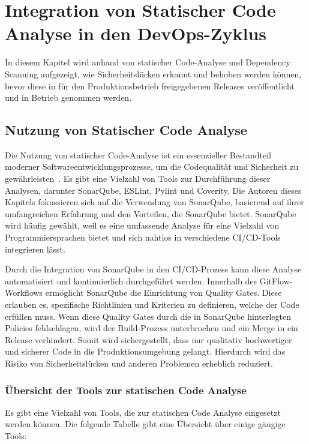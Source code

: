 \section{Integration von Statischer Code Analyse in den DevOps-Zyklus}
In diesem Kapitel wird anhand von statischer Code-Analyse und Dependency Scanning aufgezeigt, wie Sicherheitslücken erkannt und behoben werden können, bevor diese in für den Produktionsbetrieb freigegebenen Releases veröffentlicht und in Betrieb genommen werden.

\subsection{Nutzung von Statischer Code Analyse}
Die Nutzung von statischer Code-Analyse ist ein essenzieller Bestandteil moderner Softwareentwicklungsprozesse, um die Codequalität und Sicherheit zu gewährleisten~\cite{Bardas2010}. Es gibt eine Vielzahl von Tools zur Durchführung dieser Analysen, darunter SonarQube, ESLint, Pylint und Coverity. Die Autoren dieses Kapitels fokussieren sich auf die Verwendung von SonarQube, basierend auf ihrer umfangreichen Erfahrung und den Vorteilen, die SonarQube bietet. SonarQube wird häufig gewählt, weil es eine umfassende Analyse für eine Vielzahl von Programmiersprachen bietet und sich nahtlos in verschiedene CI/CD-Tools integrieren lässt.

Durch die Integration von SonarQube in den CI/CD-Prozess kann diese Analyse automatisiert und kontinuierlich durchgeführt werden. Innerhalb des GitFlow-Workflows ermöglicht SonarQube  die Einrichtung von Quality Gates. Diese erlauben es, spezifische Richtlinien und Kriterien zu definieren, welche der Code erfüllen muss. Wenn diese Quality Gates durch die in SonarQube hinterlegten Policies fehlschlagen, wird der Build-Prozess unterbrochen und ein Merge in ein Release verhindert. Somit wird sichergestellt, dass nur qualitativ hochwertiger und sicherer Code in die Produktionsumgebung gelangt. Hierdurch wird das Risiko von Sicherheitslücken und anderen Problemen erheblich reduziert.

\subsubsection{Übersicht der Tools zur statischen Code Analyse}

Es gibt eine Vielzahl von Tools, die zur statischen Code Analyse eingesetzt werden können. Die folgende Tabelle gibt eine Übersicht über einige gängige Tools:

